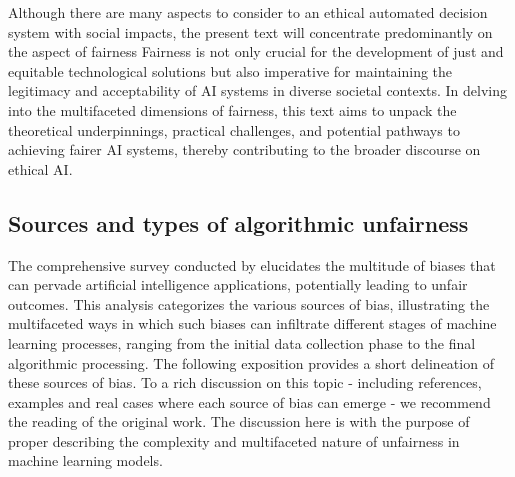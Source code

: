 Although there are many aspects to consider to an ethical automated decision system with social impacts, the present text will concentrate predominantly on the aspect of fairness Fairness is not only crucial for the development of just and equitable technological solutions but also imperative for maintaining the legitimacy and acceptability of AI systems in diverse societal contexts. In delving into the multifaceted dimensions of fairness, this text aims to unpack the theoretical underpinnings, practical challenges, and potential pathways to achieving fairer AI systems, thereby contributing to the broader discourse on ethical AI.

\subsection{Sources and types of algorithmic unfairness}


The comprehensive survey conducted by \citet{Mehrabi2019} elucidates the multitude of biases that can pervade artificial intelligence applications, potentially leading to unfair outcomes. This analysis categorizes the various sources of bias, illustrating the multifaceted ways in which such biases can infiltrate different stages of machine learning processes, ranging from the initial data collection phase to the final algorithmic processing. The following exposition provides a short delineation of these sources of bias. To a rich discussion on this topic - including references, examples and real cases where each source of bias can emerge - we recommend the reading of the original work. The discussion here is with the purpose of proper describing the complexity and multifaceted nature of unfairness in machine learning models.


